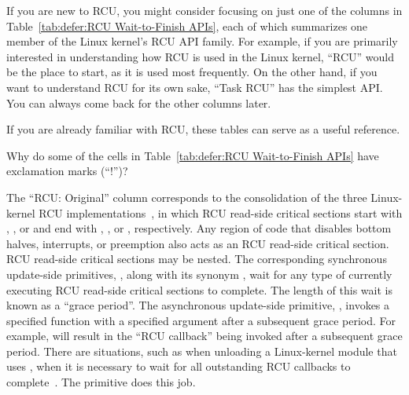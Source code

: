 If you are new to RCU, you might consider focusing on just one
of the columns in
Table~\ref{tab:defer:RCU Wait-to-Finish APIs},
each of which summarizes one member of the Linux kernel's RCU API family.
For example, if you are primarily interested in understanding how RCU
is used in the Linux kernel, ``RCU'' would be the place to start,
as it is used most frequently.
On the other hand, if you want to understand RCU for its own sake,
``Task RCU'' has the simplest API.
You can always come back for the other columns later.

If you are already familiar with RCU, these tables can
serve as a useful reference.

\QuickQuiz{}
	Why do some of the cells in
	Table~\ref{tab:defer:RCU Wait-to-Finish APIs}
	have exclamation marks (``!'')?
 \QuickQuizEnd

The ``RCU: Original'' column corresponds to the consolidation of the
three Linux-kernel RCU
implementations~\cite{PaulEMcKenney2019RCUCVE,McKenney:2019:CRS:3319647.3325836},
in which RCU read-side critical sections start with
, , or 
and end with , ,
or , respectively.
Any region of code that disables bottom halves, interrupts, or preemption
also acts as an RCU read-side critical section.
RCU read-side critical sections may be nested.
The corresponding synchronous update-side primitives,
, along with its synonym
, wait for any type of currently executing
RCU read-side critical sections to complete.
The length of this wait is known as a ``grace period''.
The asynchronous update-side primitive, ,
invokes a specified function with a specified argument after a
subsequent grace period.
For example,  will result in
the ``RCU callback'' 
being invoked after a subsequent grace period.
There are situations,
such as when unloading a Linux-kernel module that uses ,
when it is necessary to wait for all
outstanding RCU callbacks to complete~\cite{PaulEMcKenney2007rcubarrier}.
The  primitive does this job.


